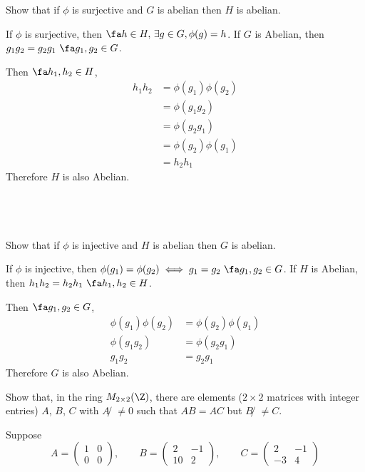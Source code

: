 \documentclass[a4paper]{article}
\begin{document}
\begin{questionbody}
Show that if $\phi$ is surjective and $G$ is abelian then $H$ is abelian.
\end{questionbody}

If $\phi$ is surjective, then $\fa h \in H,\, \exists g \in G, \phi(g) = h$. If $G$ is Abelian, then $g_1 g_2 = g_2 g_1\ \fa g_1, g_2 \in G$.

Then $\fa h_1, h_2 \in H$, \begin{align*}
	h_1 h_2 &= \phi(g_1) \phi(g_2)\\[1ex]
					 &= \phi(g_1 g_2)\\[1ex]
					 &= \phi(g_2 g_1)\\[1ex]
					 &= \phi(g_2) \phi(g_1)\\[1ex]
					 &= h_2 h_1
\end{align*}
Therefore $H$ is also Abelian.

\subsection{~} %

\begin{questionbody}
Show that if $\phi$ is injective and $H$ is abelian then $G$ is abelian.
\end{questionbody}

If $\phi$ is injective, then $\phi(g_1) = \phi(g_2) \iff g_1 = g_2\ \fa g_1, g_2 \in G$. If $H$ is Abelian, then $h_1 h_2 = h_2 h_1\ \fa h_1, h_2 \in H$.

Then $\fa g_1, g_2 \in G$, \begin{align*}
	\phi(g_1) \phi(g_2) &= \phi(g_2) \phi(g_1)\\[1ex]
	\phi(g_1 g_2) &= \phi(g_2 g_1)\\[1ex]
	g_1 g_2 &= g_2 g_1
\end{align*}
Therefore $G$ is also Abelian.


\begin{questionbody}
Show that, in the ring $M_{2 \times 2}(\Z)$, there are elements ($2 \times 2$ matrices with integer entries) $A$, $B$, $C$ with $A̸ \ne 0$ such that $AB = AC$ but $B̸ \ne C$.
\end{questionbody}

Suppose $$A = \begin{pmatrix}1 & 0\\ 0 & 0\end{pmatrix}, \qquad B = \begin{pmatrix}2 & -1\\ 10 & 2\end{pmatrix}, \qquad C = \begin{pmatrix}2 & -1\\ -3 & 4\end{pmatrix}$$
\end{document}
